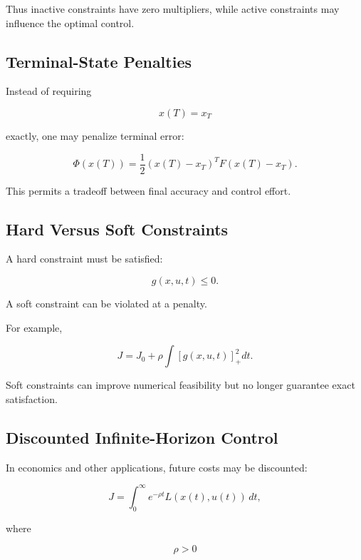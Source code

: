 Thus inactive constraints have zero multipliers, while active constraints
may influence the optimal control.

\subsection{Terminal-State Penalties}
\label{subsec:terminal-state-penalties}

Instead of requiring

\[
x(T)=x_T
\]

exactly, one may penalize terminal error:

\[
\boxed{
\Phi(x(T))
=
\frac12
(
x(T)-x_T
)^T
F
(
x(T)-x_T
).
}
\]

This permits a tradeoff between final accuracy and control effort.

\subsection{Hard Versus Soft Constraints}
\label{subsec:hard-versus-soft-control}

A hard constraint must be satisfied:

\[
\boxed{
g(x,u,t)\leq0.
}
\]

A soft constraint can be violated at a penalty.

For example,

\[
\boxed{
J
=
J_0
+
\rho
\int
[g(x,u,t)]_+^2dt.
}
\]

Soft constraints can improve numerical feasibility but no longer guarantee
exact satisfaction.

\subsection{Discounted Infinite-Horizon Control}
\label{subsec:discounted-infinite-horizon-control}

In economics and other applications, future costs may be discounted:

\[
\boxed{
J
=
\int_0^\infty
e^{-\rho t}
L(x(t),u(t))
\,dt,
}
\]

where

\[
\boxed{
\rho>0
}
\]

